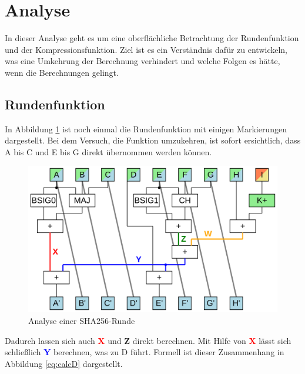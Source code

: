 \section{Analyse}
\label{sec:sha256:analyse}

In dieser Analyse geht es um eine oberflächliche Betrachtung der Rundenfunktion und der Kompressionsfunktion.
Ziel ist es ein Verständnis dafür zu entwickeln, was eine Umkehrung der Berechnung verhindert und welche Folgen es
hätte, wenn die Berechnungen gelingt.

\subsection{Rundenfunktion}
In Abbildung \ref{fig:sha256coreA} ist noch einmal die Rundenfunktion mit einigen Markierungen dargestellt.
Bei dem Versuch, die Funktion umzukehren, ist sofort ersichtlich, dass A bis C und E bis G direkt übernommen werden können.

\begin{figure}[!h]
  \centering
  \includegraphics[scale=0.4]{images/sha256coreA}
  \caption{Analyse einer SHA256-Runde}
  \label{fig:sha256coreA}
\end{figure}

Dadurch lassen sich auch \textcolor{red}{\textbf{X}} und \textcolor{Strong Green}{\textbf{Z}} direkt berechnen.
Mit Hilfe von \textcolor{red}{\textbf{X}} lässt sich schließlich \textcolor{blue}{\textbf{Y}} berechnen, was zu D führt.
Formell ist dieser Zusammenhang in Abbildung \ref{eq:calcD} dargestellt.

